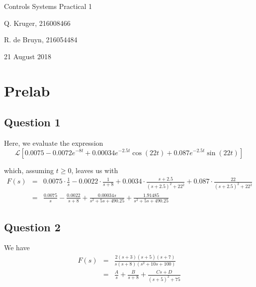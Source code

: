 \documentclass[12pt, a4paper]{article}
\begin{document}
	\begin{titlepage}
		\centering
		{\LARGE Controls Systems Practical 1 \par}
		\vspace*{1.5cm}
		{\large Q. Kruger, 216008466 \par}
		{\large R. de Bruyn, 216054484 \par}
		\vspace*{1.2cm}
		{\large 21 August 2018}
		\vspace*{\fill}
		\vspace*{\fill}
	\end{titlepage}
	\tableofcontents
	\newpage

	\section{Prelab} %
	\label{sec:prelab}
	\subsection{Question 1} %
	\label{sub:question_1_1}
		Here, we evaluate the expression
		\begin{equation}
			\label{eq:lolz}
			\mathcal{L}\left[0.0075 - 0.0072e^{-8t} + 0.00034e^{-2.5t}\cos(22t) + 0.087e^{-2.5t}\sin(22t)\right]
		\end{equation}

		\noindent which, assuming $t \ge 0$, leaves us with
		\[
			\begin{array}{rcl}
				F(s) & = & 0.0075 \cdot \frac{1}{s} - 0.0022 \cdot \frac{1}{s + 8} + 0.0034 \cdot \frac{s+2.5}{(s+2.5)^2 + 22^2} + 0.087 \cdot \frac{22}{(s+2.5)^2 + 22^2} \\
				& = & \frac{0.0075}{s} - \frac{0.0022}{s + 8} + \frac{0.00034s}{s^2 + 5s + 490.25} + \frac{1.91485}{s^2 + 5s + 490.25}
			\end{array}
		\]

	\subsection{Question 2} %
	\label{sub:question_2_1}
		We have
		\[
			\begin{array}{rcl}
				F(s) & = & \frac{2(s+3)(s+5)(s+7)}{s(s+8)(s^2 + 10s + 100)} \\
				& = & \frac{A}{s} + \frac{B}{s+8} + \frac{Cs + D}{(s+5)^2 + 75} 
			\end{array}
		\]
\end{document}
